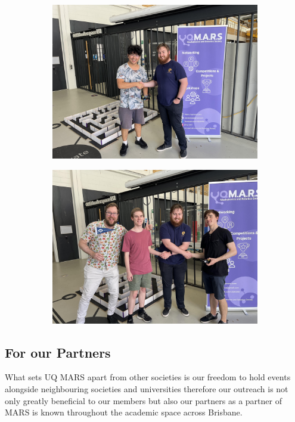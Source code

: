 \documentclass[a4paper,12pt]{report}
\begin{document}
\begin{figure}[H]
    \centering
    \begin{subfigure}{0.32\linewidth}
        \includegraphics[width=0.99\linewidth]{prospectus/2024/Photos/SecondPlace.jpg}
    \end{subfigure}
    \begin{subfigure}{0.32\linewidth}
        \includegraphics[width=0.99\linewidth]{prospectus/2024/Photos/TeamSpiritz.jpg}
    \end{subfigure}
\end{figure}

\vspace{-1.5cm}

\subsection{For our Partners}
What sets UQ MARS apart from other societies is our freedom to hold events alongside neighbouring societies and universities therefore our outreach is not only greatly beneficial to our members but also our partners as a partner of MARS is known throughout the academic space across Brisbane.
\end{document}
